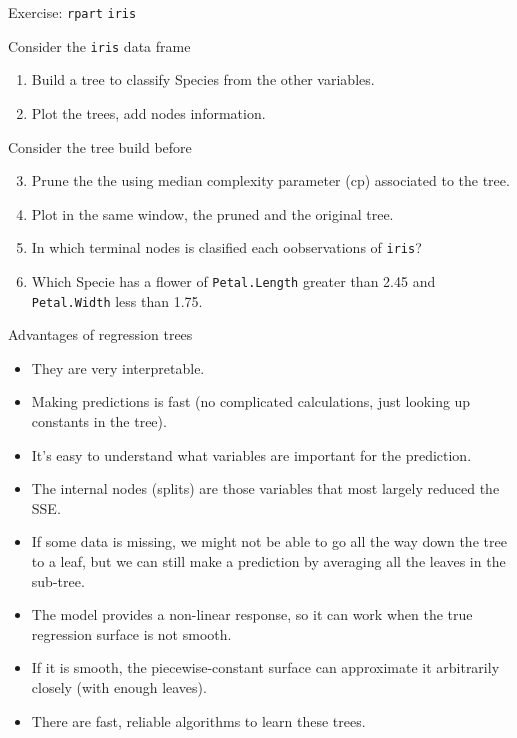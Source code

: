 \documentclass[
  10pt,
  ignorenonframetext,
]{beamer}
\providecommand{\tightlist}{%
  \setlength{\itemsep}{0pt}\setlength{\parskip}{0pt}}
\begin{document}
\begin{frame}[fragile]{Exercise: \texttt{rpart} \texttt{iris}}
\protect\hypertarget{exercise-rpart-iris}{}

\begin{block}{Consider the \texttt{iris} data frame}

\begin{enumerate}
[1)]
\tightlist
\item
  Build a tree to classify Species from the other variables.
\item
  Plot the trees, add nodes information.
\end{enumerate}

\end{block}

\begin{block}{Consider the tree build before}

\begin{enumerate}
[1)]
\setcounter{enumi}{2}
\tightlist
\item
  Prune the the using median complexity parameter (cp) associated to the
  tree.
\item
  Plot in the same window, the pruned and the original tree.
\item
  In which terminal nodes is clasified each oobservations of
  \texttt{iris}?
\item
  Which Specie has a flower of \texttt{Petal.Length} greater than 2.45
  and \texttt{Petal.Width} less than 1.75.
\end{enumerate}

\end{block}

\end{frame}

\begin{frame}{Advantages of regression trees}
\protect\hypertarget{advantages-of-regression-trees}{}

\begin{itemize}
\tightlist
\item
  They are very interpretable.
\item
  Making predictions is fast (no complicated calculations, just looking
  up constants in the tree).
\item
  It's easy to understand what variables are important for the
  prediction.
\item
  The internal nodes (splits) are those variables that most largely
  reduced the SSE.
\item
  If some data is missing, we might not be able to go all the way down
  the tree to a leaf, but we can still make a prediction by averaging
  all the leaves in the sub-tree.
\item
  The model provides a non-linear response, so it can work when the true
  regression surface is not smooth.
\item
  If it is smooth, the piecewise-constant surface can approximate it
  arbitrarily closely (with enough leaves).
\item
  There are fast, reliable algorithms to learn these trees.
\end{itemize}

\end{frame}
\end{document}
